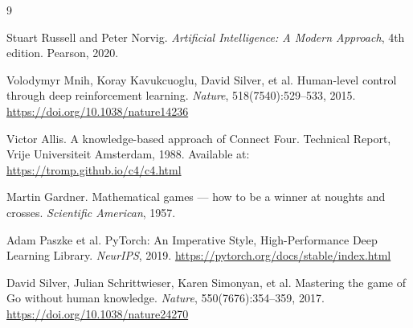 \documentclass[11pt,a4paper]{article}
\begin{document}

\begin{thebibliography}{9}

Stuart Russell and Peter Norvig.
\textit{Artificial Intelligence: A Modern Approach}, 4th edition.
Pearson, 2020.

Volodymyr Mnih, Koray Kavukcuoglu, David Silver, et al.
Human-level control through deep reinforcement learning.
\textit{Nature}, 518(7540):529--533, 2015.
\url{https://doi.org/10.1038/nature14236}

Victor Allis.
A knowledge-based approach of Connect Four.
Technical Report, Vrije Universiteit Amsterdam, 1988.
Available at: \url{https://tromp.github.io/c4/c4.html}

Martin Gardner.
Mathematical games --- how to be a winner at noughts and crosses.
\textit{Scientific American}, 1957.

Adam Paszke et al.
PyTorch: An Imperative Style, High-Performance Deep Learning Library.
\textit{NeurIPS}, 2019.
\url{https://pytorch.org/docs/stable/index.html}

David Silver, Julian Schrittwieser, Karen Simonyan, et al.
Mastering the game of Go without human knowledge.
\textit{Nature}, 550(7676):354--359, 2017.
\url{https://doi.org/10.1038/nature24270}

\end{thebibliography}
\end{document}
